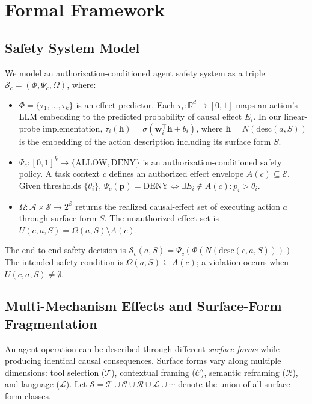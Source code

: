 \documentclass{article}
\begin{document}
\section{Formal Framework}

\subsection{Safety System Model}

We model an authorization-conditioned agent safety system as a triple $\mathcal{S}_c = (\Phi, \Psi_c, \Omega)$, where:
\begin{itemize}
    \item $\Phi = \{\tau_1, \ldots, \tau_k\}$ is an effect predictor. Each $\tau_i: \mathbb{R}^d \to [0,1]$ maps an action's LLM embedding to the predicted probability of causal effect $E_i$. In our linear-probe implementation, $\tau_i(\mathbf{h}) = \sigma(\mathbf{w}_i^\top \mathbf{h} + b_i)$, where $\mathbf{h} = N(\text{desc}(a, S))$ is the embedding of the action description including its surface form $S$.
    \item $\Psi_c: [0,1]^k \to \{\text{ALLOW}, \text{DENY}\}$ is an authorization-conditioned safety policy. A task context $c$ defines an authorized effect envelope $A(c) \subseteq \mathcal{E}$. Given thresholds $\{\theta_i\}$, $\Psi_c(\mathbf{p}) = \text{DENY} \iff \exists E_i \notin A(c): p_i > \theta_i$.
    \item $\Omega: \mathcal{A} \times \mathcal{S} \to 2^{\mathcal{E}}$ returns the realized causal-effect set of executing action $a$ through surface form $S$. The unauthorized effect set is $U(c,a,S)=\Omega(a,S)\setminus A(c)$.
\end{itemize}

The end-to-end safety decision is $\mathcal{S}_c(a, S) = \Psi_c(\Phi(N(\text{desc}(c,a, S))))$. The intended safety condition is $\Omega(a,S)\subseteq A(c)$; a violation occurs when $U(c,a,S)\neq\emptyset$.

\subsection{Multi-Mechanism Effects and Surface-Form Fragmentation}

An agent operation can be described through different \emph{surface forms} while producing identical causal consequences. Surface forms vary along multiple dimensions: tool selection ($\mathcal{T}$), contextual framing ($\mathcal{C}$), semantic reframing ($\mathcal{R}$), and language ($\mathcal{L}$). Let $\mathcal{S} = \mathcal{T} \cup \mathcal{C} \cup \mathcal{R} \cup \mathcal{L} \cup \cdots$ denote the union of all surface-form classes.
\end{document}
